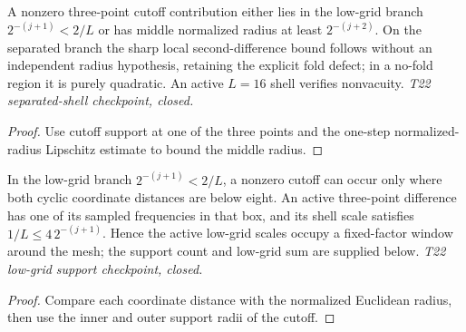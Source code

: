 \begin{lemma}
  \label{lem:normalized-cutoff-shell-radius}
  \leanok
  A nonzero three-point cutoff contribution either lies in the low-grid
  branch $2^{-(j+1)}<2/L$ or has middle normalized radius at least
  $2^{-(j+2)}$. On the separated branch the sharp local second-difference
  bound follows without an independent radius hypothesis, retaining the
  explicit fold defect; in a no-fold region it is purely quadratic.
  An active $L=16$ shell verifies nonvacuity.
  \emph{T22 separated-shell checkpoint, closed.}
\end{lemma}
\begin{proof}\leanok
  Use cutoff support at one of the three points and the one-step
  normalized-radius Lipschitz estimate to bound the middle radius.
\end{proof}

\begin{lemma}
  \label{lem:normalized-cutoff-low-grid}
  \leanok
  In the low-grid branch $2^{-(j+1)}<2/L$, a nonzero cutoff can occur
  only where both cyclic coordinate distances are below eight. An active
  three-point difference has one of its sampled frequencies in that box,
  and its shell scale satisfies $1/L\leq4\,2^{-(j+1)}$.
  Hence the active low-grid scales occupy a fixed-factor window around
  the mesh; the support count and low-grid sum are supplied below.
  \emph{T22 low-grid support checkpoint, closed.}
\end{lemma}
\begin{proof}\leanok
  Compare each coordinate distance with the normalized Euclidean radius,
  then use the inner and outer support radii of the cutoff.
\end{proof}

